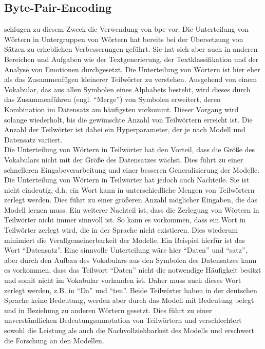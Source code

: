 \subsection{Byte-Pair-Encoding}\label{subsec:bpe}
\citet{bpe} schlugen zu diesem Zweck die Verwendung von \ac{bpe} vor.
Die Unterteilung von Wörtern in Untergruppen von Wörtern hat bereits bei der Übersetzung von Sätzen zu erheblichen Verbesserungen geführt.
Sie hat sich aber auch in anderen Bereichen und Aufgaben wie der Textgenerierung, der Textklassifikation und der Analyse von Emotionen durchgesetzt.
Die Unterteilung von Wörtern ist hier eher als das Zusammenfügen kleinerer Teilwörter zu verstehen.
Ausgehend von einem Vokabular, das aus allen Symbolen eines Alphabets besteht, wird dieses durch das Zusammenführen (engl.
\enquote{Merge}) von Symbolen erweitert, deren Kombination im Datensatz am häufigsten vorkommt.
Dieser Vorgang wird solange wiederholt, bis die gewünschte Anzahl von Teilwörtern erreicht ist.
Die Anzahl der Teilwörter ist dabei ein Hyperparameter, der je nach Modell und Datensatz variiert.\\

Die Unterteilung von Wörtern in Teilwörter hat den Vorteil, dass die Größe des Vokabulars nicht mit der Größe des Datensatzes wächst.
Dies führt zu einer schnelleren Eingabeverarbeitung und einer besseren Generalisierung der Modelle.
Die Unterteilung von Wörtern in Teilwörter hat jedoch auch Nachteile.
Sie ist nicht eindeutig, d.h.
ein Wort kann in unterschiedliche Mengen von Teilwörtern zerlegt werden.
Dies führt zu einer größeren Anzahl möglicher Eingaben, die das Modell lernen muss.
Ein weiterer Nachteil ist, dass die Zerlegung von Wörtern in Teilwörter nicht immer sinnvoll ist.
So kann es vorkommen, dass ein Wort in Teilwörter zerlegt wird, die in der Sprache nicht existieren.
Dies wiederum minimiert die Verallgemeinerbarkeit der Modelle.
Ein Beispiel hierfür ist das Wort \enquote{Datensatz}.
Eine sinnvolle Unterteilung wäre hier \enquote{Daten} und \enquote{satz}, aber durch den Aufbau des Vokabulars aus den Symbolen des Datensatzes kann es vorkommen, dass das Teilwort \enquote{Daten} nicht die notwendige Häufigkeit besitzt und somit nicht im Vokabular vorhanden ist.
Daher muss auch dieses Wort zerlegt werden, z.B.
in \enquote{Da} und \enquote{ten}.
Beide Teilwörter haben in der deutschen Sprache keine Bedeutung, werden aber durch das Modell mit Bedeutung belegt und in Beziehung zu anderen Wörtern gesetzt.
Dies führt zu einer unverständlichen Bedeutungsannotation von Teilwörtern und verschlechtert sowohl die Leistung als auch die Nachvollziehbarkeit des Modells und erschwert die Forschung an den Modellen.


